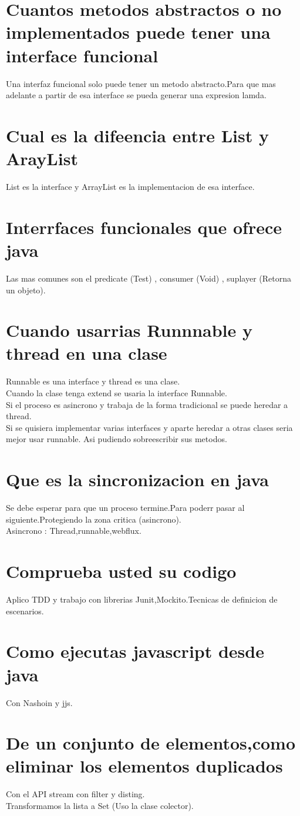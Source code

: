 \section{Cuantos metodos abstractos o no implementados puede tener una interface funcional}
Una interfaz funcional solo puede tener un metodo abstracto.Para que mas adelante a partir de esa interface se pueda generar 
una expresion lamda.
\section{Cual es la difeencia entre List y ArayList}
List es la interface y ArrayList es la implementacion de esa interface.
\section{Interrfaces funcionales que ofrece java}
Las mas comunes son el predicate (Test) , consumer (Void) , suplayer (Retorna un objeto).
\section{Cuando usarrias Runnnable y thread en una clase}
Runnable es una interface y thread es una clase.\\
Cuando la clase tenga extend se usaria la interface Runnable.\\
Si el proceso es asincrono y trabaja de la forma tradicional se puede heredar a thread.\\
Si se quisiera implementar varias interfaces y aparte heredar a otras clases seria mejor usar runnable.
Asi pudiendo sobreescribir sus metodos.
\section{Que es la sincronizacion en java}
Se debe esperar para que un proceso termine.Para poderr pasar al siguiente.Protegiendo la zona critica (asincrono).\\
Asincrono : Thread,runnable,webflux.
\section{Comprueba usted su codigo}
Aplico TDD y trabajo con librerias Junit,Mockito.Tecnicas de definicion de escenarios.
\section{Como ejecutas javascript desde java}
Con Nashoin y jjs.
\section{De un conjunto de elementos,como eliminar los elementos duplicados}
Con el API stream con filter y disting.\\
Transformamos la lista a Set (Uso la clase colector).
